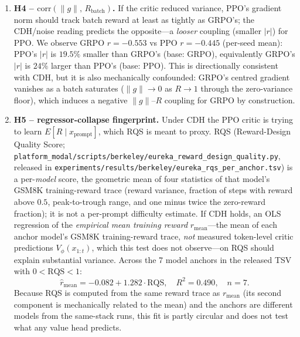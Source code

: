 \begin{enumerate}
  match the raw runs.) The result is inconclusive:
  the interval contains both $0$ and effects beyond $\pm0.1$, and
  the $6$-point point estimate itself exceeds an
  $\epsilon{=}0.02$ TOST equivalence margin, so no equivalence
  claim is licensed by failing to reject the null.
\item \textbf{H4 -- $\mathrm{corr}(\|g\|,\,R_\text{batch})$.} If the
  critic reduced variance, PPO's gradient norm should track batch
  reward at least as tightly as GRPO's; the CDH/noise reading
  predicts the opposite---a \emph{looser} coupling (smaller $|r|$)
  for PPO. We observe GRPO $r{=}{-}0.553$ vs PPO
  $r{=}{-}0.445$ (per-seed mean): PPO's $|r|$ is $19.5\%$ smaller
  than GRPO's (base: GRPO), equivalently GRPO's $|r|$ is $24\%$
  larger than PPO's (base: PPO). This is directionally consistent
  with CDH, but it is also mechanically confounded: GRPO's centred
  gradient vanishes as a batch saturates ($\|g\|\to0$ as
  $R\to1$ through the zero-variance floor), which induces a
  negative $\|g\|$--$R$ coupling for GRPO by construction.
\item \textbf{H5 -- regressor-collapse fingerprint.} Under CDH the
  PPO critic is trying to learn $E[R \mid x_\text{prompt}]$, which
  RQS is meant to proxy. RQS (Reward-Design Quality Score;
  \texttt{platform\_modal/scripts/berkeley/eureka\_reward\_design\_quality.py},
  released in \texttt{experiments/results/berkeley/eureka\_rqs\_per\_anchor.tsv})
  is a per-\emph{model} score, the geometric mean of four statistics of
  that model's GSM8K training-reward trace (reward variance, fraction of
  steps with reward above $0.5$, peak-to-trough range, and one minus twice
  the zero-reward fraction); it is not a per-prompt difficulty estimate. If CDH holds, an OLS regression
  of the \emph{empirical mean training reward} $r_\text{mean}$---the
  mean of each anchor model's GSM8K training-reward trace, \emph{not} measured
  token-level critic predictions $V_\phi(x_{1:t})$, which this test
  does not observe---on RQS should explain substantial variance.
  Across the 7 model anchors in the released TSV with
  $0 < \mathrm{RQS} < 1$:
  \begin{equation*}
    \hat r_\text{mean} = -0.082 + 1.282 \cdot \mathrm{RQS},\quad
    R^2 = 0.490,\quad n = 7.
  \end{equation*}
  Because RQS is computed from the same reward trace as $r_\text{mean}$
  (its second component is mechanically related to the mean) and the
  anchors are different models from the same-stack runs, this fit is
  partly circular and does not test what any value head predicts.
\end{enumerate}

